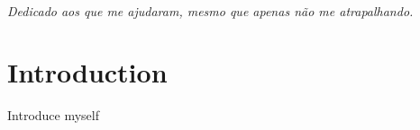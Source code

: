 \documentclass[a4paper, notoc]{tufte-book}
\begin{document}

\tableofcontents %


\listoffigures %


\listoftables %


\cleardoublepage
~\vfill
\begin{doublespace}
\noindent\fontsize{18}{22}\selectfont\itshape
\nohyphenation
Dedicado aos que me ajudaram, mesmo que apenas não me atrapalhando.
\end{doublespace}
\vfill
\vfill


\cleardoublepage
\chapter*{Introduction} %
Introduce myself


\mainmatter












\backmatter




\printindex %
\end{document}
